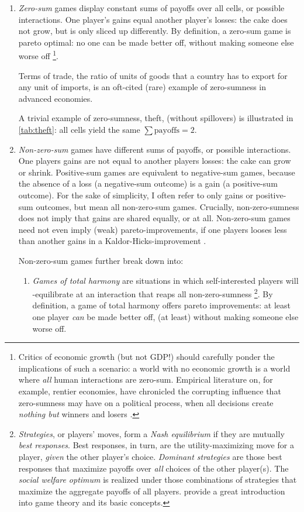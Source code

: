 \begin{enumerate}
	\item 
		\emph{Zero-sum} games display constant sums of payoffs over all cells, or possible interactions. 
		One player's gains equal another player's losses: the cake does not grow, but is only sliced up differently. 
		By definition, a zero-sum game is pareto optimal: no one can be made better off, without making someone else worse off
		\footnote{
			Critics of economic growth (but not \gls{GDP}!) should carefully ponder the implications of such a scenario: a world with no economic growth is a world where \emph{all} human interactions are zero-sum. 
			Empirical literature on, for example, rentier economies, have chronicled the corrupting influence that zero-sumness may have on a political process, when all decisions create \emph{nothing but} winners and losers \citep{Beblawi1990}.
		}.
	
		Terms of trade, the ratio of units of goods that a country has to export for any unit of imports, is an oft-cited (rare) example of zero-sumness in advanced economies.%
	
		A trivial example of zero-sumness, theft, (without spillovers) is illustrated in \autoref{tab:theft}: all cells yield the same $\sum{\text{payoffs}}=2$.
	
	\item 
		\emph{Non-zero-sum} games have different sums of payoffs, or possible interactions. 
		One players gains are not equal to another players losses: the cake can grow or shrink. Positive-sum games are equivalent to negative-sum games, because the absence of a loss (a negative-sum outcome) is a gain (a positive-sum outcome). 
		For the sake of simplicity, I often refer to only gains or positive-sum outcomes, but mean all non-zero-sum games. 
		Crucially, non-zero-sumness does not imply that gains are shared equally, or at all. Non-zero-sum games need not even imply (weak) pareto-improvements, if one players looses less than another gains in a Kaldor-Hicks-improvement \citep{Kaldor1939,Hicks1939}.
	
	Non-zero-sum games further break down into:
	\begin{enumerate}
		\item 
			\emph{Games of total harmony} are situations in which self-interested players will \citeauthor{Nash1951}-equilibrate at an interaction that reaps all non-zero-sumness
			\footnote{
				\emph{Strategies}, or players' moves, form a \emph{Nash equilibrium} if they are mutually \emph{best responses}. 
				Best responses, in turn, are the utility-maximizing move for a player, \emph{given} the other player's choice. \emph{Dominant strategies} are those best responses that maximize payoffs over \emph{all} choices of the other player(s). 
				The \emph{social welfare optimum} is realized under those combinations of strategies that maximize the aggregate payoffs of all players. 
				\cite{Kleinberg-2009-oz} provide a great introduction into game theory and its basic concepts.
			}.
			By definition, a game of total harmony offers pareto improvements: at least one player \emph{can} be made better off, (at least) without making someone else worse off.
		

\end{enumerate}
\end{enumerate}
